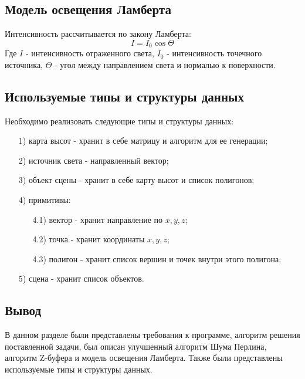 \documentclass[14pt, a4paper]{extarticle}
\begin{document}
\subsection{Модель освещения Ламберта}
Интенсивность рассчитывается по закону Ламберта:
\begin{equation}
	I = I_0\cos\Theta
\end{equation}
Где $I$ - интенсивность отраженного света, $I_0$ - интенсивность точечного источника, $\Theta$ - угол между направлением света и нормалью к поверхности.
\subsection{Используемые типы и структуры данных}
Необходимо реализовать следующие типы и структуры данных:
\begin{enumerate}
	\item[1)] карта высот - хранит в себе матрицу и алгоритм для ее генерации;
	\item[2)] источник света - направленный вектор;
	\item[3)] объект сцены - хранит в себе карту высот и список полигонов;	
	\item[4)] примитивы:
	\begin{enumerate}
		\item[4.1)] вектор - хранит направление по $x,y,z$;
		\item[4.2)] точка - хранит координаты $x,y,z$;
		\item[4.3)] полигон - хранит список вершин и точек внутри этого полигона;
	\end{enumerate}
	\item[5)] сцена - хранит список объектов.
\end{enumerate}
\subsection{Вывод}
В данном разделе были представлены требования к программе, алгоритм решения поставленной задачи, был описан улучшенный алгоритм Шума Перлина, алгоритм Z-буфера и модель освещения Ламберта. Также были представлены используемые типы и структуры данных.
\end{document}

